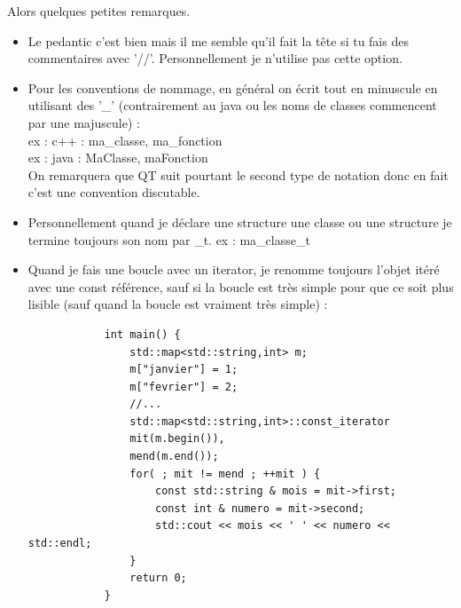 \documentclass[11pt,twoside,a4paper]{article}
\begin{document}
Alors quelques petites remarques.
	\begin{itemize}
		\item Le pedantic c'est bien mais il me semble qu'il fait la t{\^e}te si tu fais des commentaires avec '//'. Personnellement je n'utilise pas cette option.
		\item Pour les conventions de nommage, en g{\'e}n{\'e}ral on {\'e}crit tout en minuscule en utilisant des '\_' (contrairement au java ou les noms de classes commencent par une majuscule) :~\\
ex : c++ : ma\_classe, ma\_fonction~\\
ex : java : MaClasse, maFonction~\\
On remarquera que QT suit pourtant le second type de notation donc en fait c'est une convention discutable.
		\item Personnellement quand je d{\'e}clare une structure une classe ou une structure je termine toujours son nom par \_t.
ex : ma\_classe\_t
		\item Quand je fais une boucle avec un iterator, je renomme toujours l'objet it{\'e}r{\'e} avec une const r{\'e}f{\'e}rence, sauf si la boucle est tr{\`e}s simple pour que ce soit plus lisible (sauf quand la boucle est vraiment tr{\`e}s simple) :~\\
		\begin{verbatim}
            int main() {
                std::map<std::string,int> m;
                m["janvier"] = 1;
                m["fevrier"] = 2;
                //...
                std::map<std::string,int>::const_iterator
                mit(m.begin()),
                mend(m.end());
                for( ; mit != mend ; ++mit ) {
                    const std::string & mois = mit->first;
                    const int & numero = mit->second;
                    std::cout << mois << ' ' << numero << std::endl;
                }
                return 0;
            }
		\end{verbatim}~\\


\end{itemize}
\end{document}
